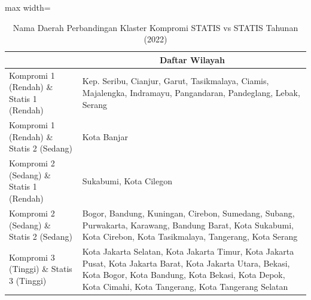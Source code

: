 \begin{table}[H]
\centering
\caption{Nama Daerah Perbandingan Klaster Kompromi STATIS vs STATIS Tahunan (2022)} \label{tab:app1comp_statis_name_2022}
\begin{adjustbox}{max width=\textwidth}
\begin{tabular}{|>{\centering\arraybackslash}p{4cm}|p{10cm}|}
\hline
\multicolumn{1}{|c|}{\textbf{Kategori}} & \multicolumn{1}{c|}{\textbf{Daftar Wilayah}} \\
\hline
Kompromi 1 (Rendah) \& Statis 1 (Rendah) & Kep. Seribu, Cianjur, Garut, Tasikmalaya, Ciamis, Majalengka, Indramayu, Pangandaran, Pandeglang, Lebak, Serang \\
\hline
Kompromi 1 (Rendah) \& Statis 2 (Sedang) & Kota Banjar \\
\hline
Kompromi 2 (Sedang) \& Statis 1 (Rendah) & Sukabumi, Kota Cilegon \\
\hline
Kompromi 2 (Sedang) \& Statis 2 (Sedang) & Bogor, Bandung, Kuningan, Cirebon, Sumedang, Subang, Purwakarta, Karawang, Bandung Barat, Kota Sukabumi, Kota Cirebon, Kota Tasikmalaya, Tangerang, Kota Serang \\
\hline
Kompromi 3 (Tinggi) \& Statis 3 (Tinggi) & Kota Jakarta Selatan, Kota Jakarta Timur, Kota Jakarta Pusat, Kota Jakarta Barat, Kota Jakarta Utara, Bekasi, Kota Bogor, Kota Bandung, Kota Bekasi, Kota Depok, Kota Cimahi, Kota Tangerang, Kota Tangerang Selatan \\
\hline
\end{tabular}
\end{adjustbox}
\end{table}